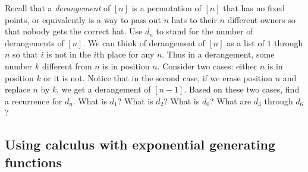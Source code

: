 \itemesi Recall that a {\em derangement} of $[n]$ is a permutation of
$[n]$ that has no fixed points, or equivalently is a way to pass out
$n$ hats to their $n$ different owners so that nobody gets the correct
hat.  Use
$d_n$ to stand for the number of derangements of $[n]$.  We can think of
derangement of $[n]$ as a list of $1$ through $n$ so that
$i$ is not in the $i$th place for any $n$.  Thus in a derangement, some
number
$k$ different from $n$ is in position $n$.  Consider two cases: either
$n$ is in position $k$ or it is not.  Notice that in the second case, if
we erase position $n$ and replace $n$ by $k$, we get a derangement of
$[n-1]$.  Based on these two cases, find a recurrence for $d_n$.  What is
$d_1$?  What is $d_2$?  What is $d_0$?  What are $d_3$ through
$d_6$?\label{derangementrecurrence}

\subsection{Using calculus  with exponential generating functions}

